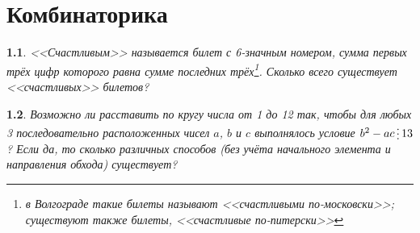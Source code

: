 \documentclass[a4paper]{book}
\theoremstyle{problemstyle}
\newtheorem{problem}{} %
\newcommand{\divisible}{\mathop{\raisebox{-2pt}{\vdots}}}
\begin{document}
    \chapter{Комбинаторика}
    \begin{problem}
        <<Счастливым>> называется билет с 6-значным номером, сумма первых трёх
        цифр которого равна сумме последних трёх\footnote{в Волгограде такие
        билеты называют <<счастливыми по-московски>>; существуют также билеты,
        <<счастливые по-питерски>>}. Сколько всего существует
        <<счастливых>> билетов?
    \end{problem}
    \begin{problem}
        Возможно ли расставить по кругу числа от 1 до 12 так, чтобы для любых 3
        последовательно расположенных чисел \(a\), \(b\) и \(c\) выполнялось
        условие \( b^2 - ac \divisible 13 \)? Если да, то сколько различных
        способов (без учёта начального элемента и направления обхода) существует?
    \end{problem}
\end{document}
